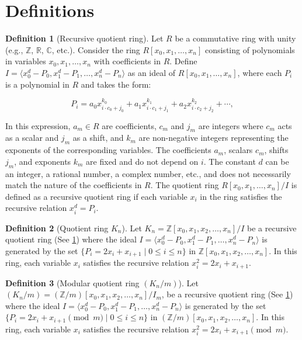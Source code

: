 \documentclass{article}
\theoremstyle{plain}
\theoremstyle{definition}
\newtheorem{definition}{Definition}
\newcommand{\K}{K}
\begin{document}
\section{Definitions}
\begin{definition}[Recursive quotient ring] \label{definition:recursivering}
Let \( R \) be a commutative ring with unity (e.g., \(\mathbb{Z}\), \(\mathbb{R}\), \(\mathbb{C}\), etc.). Consider the ring \( R[x_0, x_1, \ldots, x_n] \) consisting of polynomials in variables \( x_0, x_1, \ldots, x_n \) with coefficients in \( R \). Define \( I = \langle x_0^d - P_0, x_1^d - P_1, \ldots, x_n^d - P_n \rangle \) as an ideal of \( R[x_0, x_1, \ldots, x_n] \), where each \( P_i \) is a polynomial in \( R \) and takes the form:

\[ P_i = a_0 x_{i \cdot c_0 + j_0}^{k_0} + a_1 x_{i \cdot c_1 + j_1}^{k_1} + a_2 x_{i \cdot c_2 + j_2}^{k_2} + \cdots, \]

In this expression, \( a_m \in R \) are coefficients, \( c_m \) and \( j_m \) are integers where \( c_m \) acts as a scalar and \( j_m \) as a shift, and \( k_m \) are non-negative integers representing the exponents of the corresponding variables. The coefficients \( a_m \), scalars \( c_m \), shifts \( j_m \), and exponents \( k_m \) are fixed and do not depend on \( i \). The constant \( d \) can be an integer, a rational number, a complex number, etc., and does not necessarily match the nature of the coefficients in \( R \). The quotient ring \( R[x_0, x_1, \ldots, x_n]/I \) is defined as a recursive quotient ring if each variable \( x_i \) in the ring satisfies the recursive relation \( x_i^d = P_i \).
\end{definition}

\begin{definition}[Quotient ring $\K_n$] \label{definition:ring}
Let $\K_n = \mathbb{Z}[x_0, x_1, x_2, \ldots, x_n]/I$ be a recursive quotient ring (See \cref{definition:recursivering}) where the ideal \( I = \langle x_0^d - P_0, x_1^d - P_1, \ldots, x_n^d - P_n \rangle \) is generated by the set $\{P_i = 2x_i + x_{i+1} \mid 0 \leq i \leq n \}$ in $\mathbb{Z}[x_0, x_1, x_2, \ldots, x_n]$. In this ring, each variable $x_i$ satisfies the recursive relation $x_i^2 = 2x_i + x_{i+1}$.
\end{definition}

\begin{definition}[Modular quotient ring $(\K_n/m)$] \label{definition:modring}
Let $(\K_n/m) = (\mathbb{Z}/m)[x_0, x_1, x_2, \ldots, x_n]/I_m$, be a recursive quotient ring (See \cref{definition:recursivering}) where the ideal \( I = \langle x_0^d - P_0, x_1^d - P_1, \ldots, x_n^d - P_n \rangle \) is generated by the set $\{P_i = 2x_i + x_{i+1} \pmod{m} \mid 0 \leq i \leq n \}$ in $(\mathbb{Z}/m)[x_0, x_1, x_2, \ldots, x_n]$. In this ring, each variable $x_i$ satisfies the recursive relation $x_i^2 = 2x_i + x_{i+1} \pmod{m}$.
\end{definition}
\end{document}
